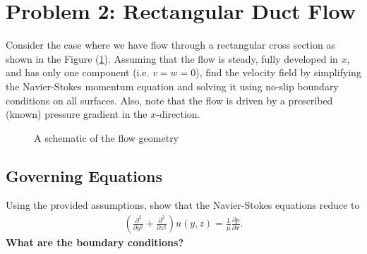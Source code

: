 \documentclass[11pt]{article}
\begin{document}
    \section{Problem 2:  Rectangular Duct Flow}
    Consider the case where we have flow through a rectangular cross section as shown in the Figure (\ref{fig:rect_duct}). Assuming that the flow is steady, fully developed in $x$, and has only one component (i.e. $v = w = 0$), find the velocity field by simplifying the Navier-Stokes momentum equation and solving it using no-slip boundary conditions on all surfaces. Also, note that the flow is driven by a prescribed (known) pressure gradient in the $x$-direction.

    \begin{figure}[H]
		\centering
		\caption{A schematic of the flow geometry}
		\label{fig:rect_duct}
	\end{figure}

    \subsection{Governing Equations}
    Using the provided assumptions, show that the Navier-Stokes equations reduce to
    \begin{align}
      \left(\frac{\partial^2}{\partial y^2} + \frac{\partial^2}{\partial z^2}\right) u(y,z) = \frac{1}{\mu}\frac{\partial p}{\partial x}.
    \end{align}
    \textbf{What are the boundary conditions?}
    
\end{document}
